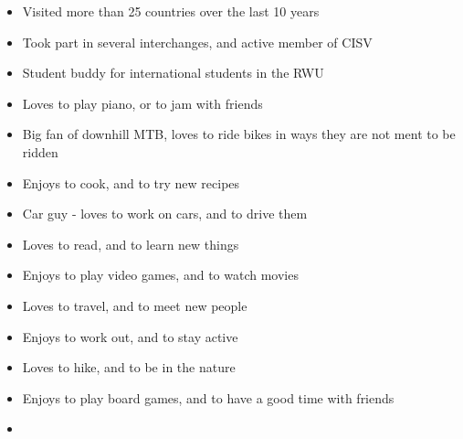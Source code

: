 \documentclass[10pt,a4paper,ragged2e,withhyper]{altacv}
\begin{document}
\begin{paracol}{2}
\divider\smallskip


\divider\smallskip


\smallskip


\divider

\divider

\divider


\medskip



\newpage


\begin{itemize}
\item Visited more than 25 countries over the last 10 years
\item Took part in several interchanges, and active member of CISV
\item Student buddy for international students in the RWU
\end{itemize}

\divider

\begin{itemize}
  \item Loves to play piano, or to jam with friends
  \item Big fan of downhill MTB, loves to ride bikes in ways they are not ment to be ridden
  \item Enjoys to cook, and to try new recipes  
  \item Car guy - loves to work on cars, and to drive them
  \item Loves to read, and to learn new things
  \item Enjoys to play video games, and to watch movies
  \item Loves to travel, and to meet new people
  \item Enjoys to work out, and to stay active
  \item Loves to hike, and to be in the nature
  \item Enjoys to play board games, and to have a good time with friends
  \item 
\end{itemize}


\end{paracol}
\end{document}
